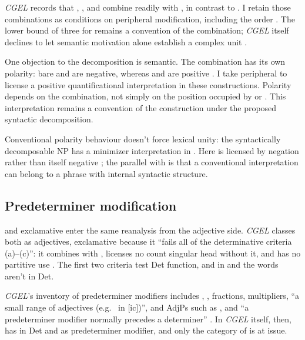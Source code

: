 \documentclass[12pt]{article}
\begin{document}
\textit{CGEL} records that , , and  combine readily with , in contrast to  \citep[392]{huddleston2002}. I retain those combinations as conditions on peripheral modification, including the order . The lower bound of three for  \citep[392]{huddleston2002} remains a convention of the combination; \textit{CGEL} itself declines to let semantic motivation alone establish a complex unit \citep[621]{huddleston2002}.

One objection to the decomposition is semantic. The combination has its own polarity: bare  and  are negative, whereas  and  are positive \citep[393--394]{huddleston2002}. I take peripheral  to license a positive quantificational interpretation in these constructions. Polarity depends on the combination, not simply on the position occupied by  or . This interpretation remains a convention of the construction under the proposed syntactic decomposition.

Conventional polarity behaviour doesn't force lexical unity: the syntactically decomposable NP  has a minimizer interpretation in  \citep[549--550, 725]{huddleston2002}. Here  is licensed by negation rather than itself negative \citep[822--823]{huddleston2002}; the parallel with  is that a conventional interpretation can belong to a phrase with internal syntactic structure.

\subsection{Predeterminer modification}\label{sec:predeterminer-a}

 and exclamative  enter the same reanalysis from the adjective side. \textit{CGEL} classes both as adjectives, exclamative  because it \enquote{fails all of the determinative criteria (a)--(c)}: it combines with , licenses no count singular head without it, and has no partitive use \citep[539--540]{huddleston2002}. The first two criteria test Det function, and in  and  the words aren't in Det.

\textit{CGEL}'s inventory of predeterminer modifiers includes , , fractions, multipliers, \enquote{a small range of adjectives (e.g.\  in [ic])}, and AdjPs such as , and \enquote{a predeterminer modifier normally precedes a determiner} \citep[331]{huddleston2002}. In \textit{CGEL} itself, then,  has  in Det and  as predeterminer modifier, and only the category of  is at issue.
\end{document}
